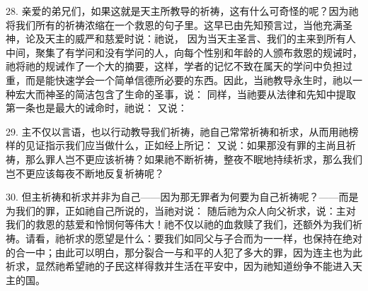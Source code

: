 28. 亲爱的弟兄们，如果这就是天主所教导的祈祷，这有什么可奇怪的呢？因为祂将我们所有的祈祷浓缩在一个救恩的句子里。这早已由先知预言过，当他充满圣神，论及天主的威严和慈爱时说：祂说， 因为当天主圣言、我们的主来到所有人中间，聚集了有学问和没有学问的人，向每个性别和年龄的人颁布救恩的规诫时，祂将祂的规诫作了一个大的摘要，这样，学者的记忆不致在属天的学问中负担过重，而是能快速学会一个简单信德所必要的东西。因此，当祂教导永生时，祂以一种宏大而神圣的简洁包含了生命的圣事，说： 同样，当祂要从法律和先知中提取第一条也是最大的诫命时，祂说：  又说：\par

29. 主不仅以言语，也以行动教导我们祈祷，祂自己常常祈祷和祈求，从而用祂榜样的见证指示我们应当做什么，正如经上所记： 又说：如果那没有罪的主尚且祈祷，那么罪人岂不更应该祈祷？如果祂不断祈祷，整夜不眠地持续祈求，那么我们岂不更应该每夜不断地反复祈祷呢？\par

30. 但主祈祷和祈求并非为自己——因为那无罪者为何要为自己祈祷呢？——而是为我们的罪，正如祂自己所说的，当祂对说： 随后祂为众人向父祈求，说：主对我们的救恩的慈爱和怜悯何等伟大！祂不仅以祂的血救赎了我们，还额外为我们祈祷。请看，祂祈求的愿望是什么：要我们如同父与子合而为一一样，也保持在绝对的合一中；由此可以明白，那分裂合一与和平的人犯了多大的罪，因为连主也为此祈求，显然祂希望祂的子民这样得救并生活在平安中，因为祂知道纷争不能进入天主的国。\par

